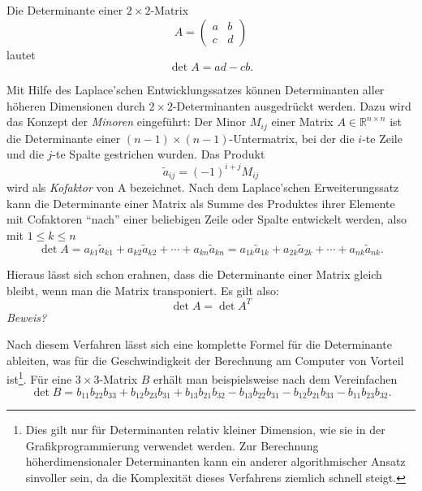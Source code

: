 Die Determinante einer $2 \times 2$-Matrix
\begin{equation*}
 A = \begin{pmatrix}
      a & b \\
      c & d
     \end{pmatrix}
\end{equation*}
lautet
\begin{equation}
 \det A = ad - cb.
\end{equation}

Mit Hilfe des Laplace'schen Entwicklungssatzes können Determinanten aller höheren Dimensionen durch $2 \times 2$-Determinanten ausgedrückt werden. Dazu wird das Konzept der \emph{Minoren} eingeführt: Der Minor $M_{ij}$ einer Matrix $A \in \mathbb{R}^{n \times n}$ ist die Determinante einer $(n-1) \times (n-1)$-Untermatrix, bei der die $i$-te Zeile und die $j$-te Spalte gestrichen wurden. Das Produkt
\begin{equation}
\label{cofactor}
 \tilde a_{ij} = (-1)^{i+j} M_{ij}
\end{equation}
wird als \emph{Kofaktor} von A bezeichnet. Nach dem Laplace'schen Erweiterungssatz kann die Determinante einer Matrix als Summe des Produktes ihrer Elemente mit Cofaktoren \enquote{nach} einer beliebigen Zeile oder Spalte entwickelt werden, also mit $1 \leq k \leq n$
\begin{equation}
 \det A = a_{k1} \tilde a_{k1} + a_{k2} \tilde a_{k2} + \cdots + a_{kn} \tilde a_{kn} = a_{1k} \tilde a_{1k} + a_{2k} \tilde a_{2k} + \cdots + a_{nk} \tilde a_{nk}.
\end{equation}

Hieraus lässt sich schon erahnen, dass die Determinante einer Matrix gleich bleibt, wenn man die Matrix transponiert. Es gilt also:
\begin{equation}
\label{transposeddeterminant}
 \det A = \det A^T
\end{equation}
\emph{Beweis?}

Nach diesem Verfahren lässt sich eine komplette Formel für die Determinante ableiten, was für die Geschwindigkeit der Berechnung am Computer von Vorteil ist\footnote{Dies gilt nur für Determinanten relativ kleiner Dimension, wie sie in der Grafikprogrammierung verwendet werden. Zur Berechnung höherdimensionaler Determinanten kann ein anderer algorithmischer Ansatz sinvoller sein, da die Komplexität dieses Verfahrens ziemlich schnell steigt.}. Für eine $3 \times 3$-Matrix $B$ erhält man beispielsweise nach dem Vereinfachen
\begin{equation}
 \det B = b_{11} b_{22} b_{33} + b_{12} b_{23} b_{31} + b_{13} b_{21} b_{32} - b_{13} b_{22} b_{31} - b_{12} b_{21} b_{33} - b_{11} b_{23} b_{32}.
\end{equation}

